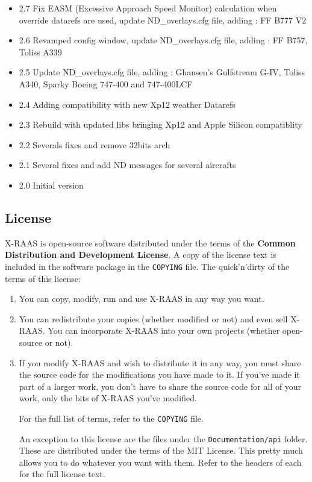 \documentclass[a4paper,12pt]{article}
\begin{document}
\begin{itemize}

\item 2.7 Fix EASM (Excessive Approach Speed Monitor) calculation when override datarefs are used, update ND\_overlays.cfg file, adding : FF B777 V2

\item 2.6 Revamped config window, update ND\_overlays.cfg file, adding : FF B757, Toliss A339

\item 2.5 Update ND\_overlays.cfg file, adding : Ghansen's Gulfstream G-IV, Toliss A340, Sparky Boeing 747-400 and 747-400LCF

\item 2.4 Adding compatibility with new Xp12 weather Datarefs

\item 2.3 Rebuild with updated libs bringing Xp12 and Apple Silicon compatiblity

\item 2.2 Severals fixes and remove 32bits arch

\item 2.1 Several fixes and add ND messages for several aircrafts

\item 2.0 Initial version

\end{itemize}


\subsection{License}

X-RAAS is open-source software distributed under the terms of the
\textbf{Common Distribution and Development License}. A copy of the
license text is included in the software package in the \texttt{COPYING}
file. The quick'n'dirty of the terms of this license:

\begin{enumerate}

\item You can copy, modify, run and use X-RAAS in any way you want.

\item You can redistribute your copies (whether modified or not) and even
sell X-RAAS. You can incorporate X-RAAS into your own projects (whether
open-source or not).

\item If you modify X-RAAS and wish to distribute it in any way, you must
share the source code for the modifications you have made to it. If
you've made it part of a larger work, you don't have to share the source
code for all of your work, only the bits of X-RAAS you've modified.

For the full list of terms, refer to the \texttt{COPYING} file.

An exception to this license are the files under the
\texttt{Documentation/api} folder. These are distributed under the terms
of the MIT License. This pretty much allows you to do whatever you want
with them. Refer to the headers of each for the full license text.

\end{enumerate}
\end{document}
